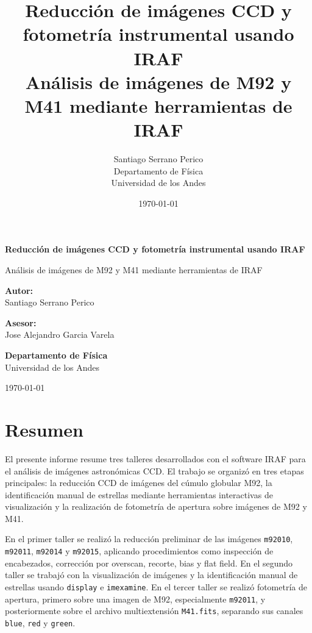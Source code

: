 \documentclass[12pt,letterpaper]{article}
\title{
    \textbf{Reducción de imágenes CCD y fotometría instrumental usando IRAF}\\
    \large Análisis de imágenes de M92 y M41 mediante herramientas de IRAF
}
\author{
    Santiago Serrano Perico\\
    Departamento de Física\\
    Universidad de los Andes
}
\date{\today}
\begin{document}
\begin{titlepage}
    \centering
    
    \vspace*{2cm}
    
    {\Large \textbf{Reducción de imágenes CCD y fotometría instrumental usando IRAF}\par}
    
    \vspace{1cm}
    
    {\large Análisis de imágenes de M92 y M41 mediante herramientas de IRAF\par}
    
    \vspace{2cm}
    
    \textbf{Autor:}\\
    Santiago Serrano Perico
    
    \vspace{1cm}
    
    \textbf{Asesor:}\\
    Jose Alejandro Garcia Varela
    
    \vspace{1cm}
    
    \textbf{Departamento de Física}\\
    Universidad de los Andes
    
    \vfill
    
    \today
    
\end{titlepage}

\tableofcontents
\newpage

\section{Resumen}

El presente informe resume tres talleres desarrollados con el software IRAF para el análisis de imágenes astronómicas CCD. El trabajo se organizó en tres etapas principales: la reducción CCD de imágenes del cúmulo globular M92, la identificación manual de estrellas mediante herramientas interactivas de visualización y la realización de fotometría de apertura sobre imágenes de M92 y M41.

En el primer taller se realizó la reducción preliminar de las imágenes \texttt{m92010}, \texttt{m92011}, \texttt{m92014} y \texttt{m92015}, aplicando procedimientos como inspección de encabezados, corrección por overscan, recorte, bias y flat field. En el segundo taller se trabajó con la visualización de imágenes y la identificación manual de estrellas usando \texttt{display} e \texttt{imexamine}. En el tercer taller se realizó fotometría de apertura, primero sobre una imagen de M92, especialmente \texttt{m92011}, y posteriormente sobre el archivo multiextensión \texttt{M41.fits}, separando sus canales \texttt{blue}, \texttt{red} y \texttt{green}.
\end{document}
